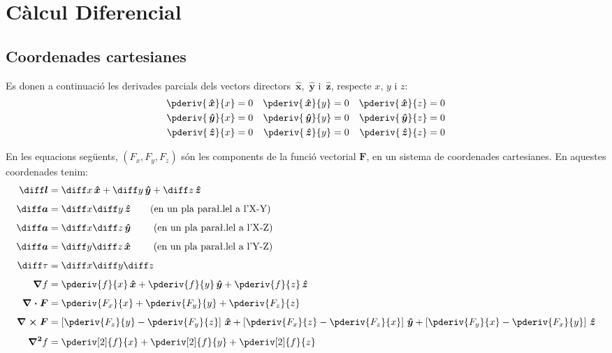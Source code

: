 \documentclass[catalan,a4paper,twoside,11pt]{article}
\begin{document}
\section{C\`{a}lcul Diferencial }

\subsection{Coordenades cartesianes}
\renewcommand{\va}{\ensuremath{\,\boldsymbol{\hat{x}}}}
\renewcommand{\vb}{\ensuremath{\,\boldsymbol{\hat{y}}}}
\renewcommand{\vc}{\ensuremath{\,\boldsymbol{\hat{z}}}}

Es donen a continuaci\'{o} les derivades parcials dels vectors directors $\va$, $\vb$ i $\vc$, respecte $x$, $y$ i $z$:
\begin{subequations}
\begin{align}
   \pderiv{\va}{x} &= 0 & \pderiv{\va}{y} &= 0 & \pderiv{\va}{z} &= 0 \\
   \pderiv{\vb}{x} &= 0 & \pderiv{\vb}{y} &= 0 & \pderiv{\vb}{z} &= 0 \\
   \pderiv{\vc}{x} &= 0 & \pderiv{\vc}{y} &= 0 & \pderiv{\vc}{z} &= 0
\end{align}
\end{subequations}

En les equacions seg\"{u}ents, $(F_x,F_y,F_z)$  s\'{o}n les
components de la funci\'{o}  vectorial $\boldsymbol{F}$, en un sistema de
coordenades cartesianes. En aquestes coordenades tenim:
\begin{align}
    \boldsymbol{\diff l} &= \diff x \va + \diff y \vb + \diff z \vc\\[1ex]
    \boldsymbol{\diff a} &= \diff x \diff y \vc \qquad\text{(en un pla
    para{\l.l}el a l'X-Y)}\\[1ex]
    \boldsymbol{\diff a} &= \diff x \diff z \vb \qquad\text{ (en un pla
    para{\l.l}el a l'X-Z)}\\[1ex]
    \boldsymbol{\diff a} &= \diff y \diff z \va \qquad\text{ (en un pla
    para{\l.l}el a l'Y-Z)}\\[1ex]
    \diff\tau &= \diff x \diff y \diff z\\[1ex]
    \boldsymbol{\nabla}f &= \pderiv{f}{x}\va + \pderiv{f}{y}\vb
    + \pderiv{f}{z}\vc\\[1ex]
    \boldsymbol{\nabla\cdot F} &= \pderiv{F_x}{x} + \pderiv{F_y}{y}
    + \pderiv{F_z}{z}\\[1ex]
    \boldsymbol{\nabla\times F} &= \left[\pderiv{F_z}{y}-\pderiv{F_y}{z}\right]\va +
    \left[\pderiv{F_x}{z}-\pderiv{F_z}{x}\right]\vb +
    \left[\pderiv{F_y}{x}-\pderiv{F_x}{y}\right]\vc\\[1ex]
    \boldsymbol{\nabla^2}f &= \pderiv[2]{f}{x} + \pderiv[2]{f}{y}+ \pderiv[2]{f}{z}
\end{align}
\end{document}
